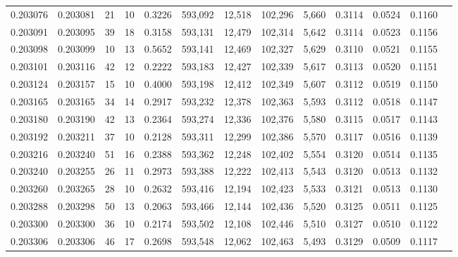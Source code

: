 \begin{tabular}{rrrrrrrrrrrrr}
0.203076 & 0.203081 &    21 &  10 &                                     0.3226 & 593,092 &  12,518 & 102,296 &   5,660 & 0.3114 & 0.0524 & 0.1160 \\
0.203091 & 0.203095 &    39 &  18 &                                     0.3158 & 593,131 &  12,479 & 102,314 &   5,642 & 0.3114 & 0.0523 & 0.1156 \\
0.203098 & 0.203099 &    10 &  13 &                                     0.5652 & 593,141 &  12,469 & 102,327 &   5,629 & 0.3110 & 0.0521 & 0.1155 \\
0.203101 & 0.203116 &    42 &  12 &                                     0.2222 & 593,183 &  12,427 & 102,339 &   5,617 & 0.3113 & 0.0520 & 0.1151 \\
0.203124 & 0.203157 &    15 &  10 &                                     0.4000 & 593,198 &  12,412 & 102,349 &   5,607 & 0.3112 & 0.0519 & 0.1150 \\
0.203165 & 0.203165 &    34 &  14 &                                     0.2917 & 593,232 &  12,378 & 102,363 &   5,593 & 0.3112 & 0.0518 & 0.1147 \\
0.203180 & 0.203190 &    42 &  13 &                                     0.2364 & 593,274 &  12,336 & 102,376 &   5,580 & 0.3115 & 0.0517 & 0.1143 \\
0.203192 & 0.203211 &    37 &  10 &                                     0.2128 & 593,311 &  12,299 & 102,386 &   5,570 & 0.3117 & 0.0516 & 0.1139 \\
0.203216 & 0.203240 &    51 &  16 &                                     0.2388 & 593,362 &  12,248 & 102,402 &   5,554 & 0.3120 & 0.0514 & 0.1135 \\
0.203240 & 0.203255 &    26 &  11 &                                     0.2973 & 593,388 &  12,222 & 102,413 &   5,543 & 0.3120 & 0.0513 & 0.1132 \\
0.203260 & 0.203265 &    28 &  10 &                                     0.2632 & 593,416 &  12,194 & 102,423 &   5,533 & 0.3121 & 0.0513 & 0.1130 \\
0.203288 & 0.203298 &    50 &  13 &                                     0.2063 & 593,466 &  12,144 & 102,436 &   5,520 & 0.3125 & 0.0511 & 0.1125 \\
0.203300 & 0.203300 &    36 &  10 &                                     0.2174 & 593,502 &  12,108 & 102,446 &   5,510 & 0.3127 & 0.0510 & 0.1122 \\
0.203306 & 0.203306 &    46 &  17 &                                     0.2698 & 593,548 &  12,062 & 102,463 &   5,493 & 0.3129 & 0.0509 & 0.1117 \\

\end{tabular}
